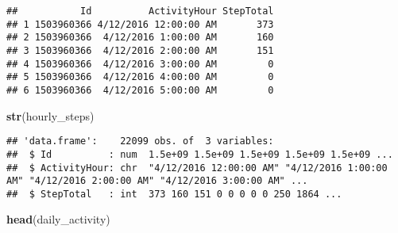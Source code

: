 \documentclass[
]{article}
\newenvironment{Shaded}{\begin{snugshade}}{\end{snugshade}}
\newcommand{\FunctionTok}[1]{\textcolor[rgb]{0.13,0.29,0.53}{\textbf{#1}}}
\newcommand{\NormalTok}[1]{#1}
\begin{document}
\begin{verbatim}
##           Id          ActivityHour StepTotal
## 1 1503960366 4/12/2016 12:00:00 AM       373
## 2 1503960366  4/12/2016 1:00:00 AM       160
## 3 1503960366  4/12/2016 2:00:00 AM       151
## 4 1503960366  4/12/2016 3:00:00 AM         0
## 5 1503960366  4/12/2016 4:00:00 AM         0
## 6 1503960366  4/12/2016 5:00:00 AM         0
\end{verbatim}

\begin{Shaded}
\begin{Highlighting}[]
\FunctionTok{str}\NormalTok{(hourly\_steps)}
\end{Highlighting}
\end{Shaded}

\begin{verbatim}
## 'data.frame':    22099 obs. of  3 variables:
##  $ Id          : num  1.5e+09 1.5e+09 1.5e+09 1.5e+09 1.5e+09 ...
##  $ ActivityHour: chr  "4/12/2016 12:00:00 AM" "4/12/2016 1:00:00 AM" "4/12/2016 2:00:00 AM" "4/12/2016 3:00:00 AM" ...
##  $ StepTotal   : int  373 160 151 0 0 0 0 0 250 1864 ...
\end{verbatim}

\begin{Shaded}
\begin{Highlighting}[]
\FunctionTok{head}\NormalTok{(daily\_activity)}
\end{Highlighting}
\end{Shaded}
\end{document}
